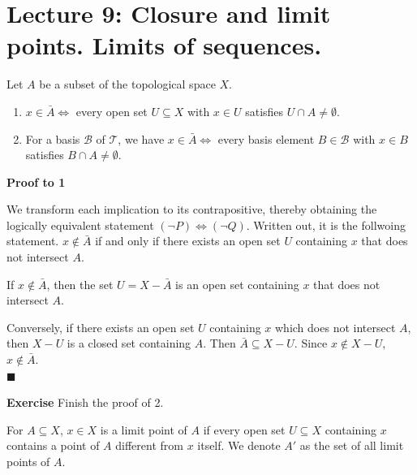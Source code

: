 \documentclass[main.tex]{subfiles}
\begin{document}
\pagestyle{plain}
\setcounter{chapter}{8}

\chapter{Lecture 9: Closure and limit points. Limits of sequences. }
\label{chap:Lecture9}

\begin{theorem}
    Let $A$ be a subset of the topological space $X$. 
    \begin{enumerate}
        \item $x\in \bar{A} \Longleftrightarrow $ every open set $U \subseteq X$ with $x \in U$ satisfies $U \cap A \neq \emptyset$.
        \item For a basis $\mathcal{B}$ of $\mathcal{T}$, we have $x \in \bar{A} \Longleftrightarrow$ every basis element $B \in \mathcal{B}$ with $x \in B$ satisfies $B \cap A \neq \emptyset$. 
    \end{enumerate}
\end{theorem}

\par \noindent \textbf{Proof to 1} 
\par We transform each implication to its contrapositive, thereby obtaining the logically equivalent statement $(\lnot P) \Longleftrightarrow (\lnot Q)$. Written out, it is the follwoing statement. $x\notin \bar{A}$ if and only if there exists an open set $U$ containing $x$ that does not intersect $A$. 
\par If $x \notin \bar{A}$, then the set $U = X - \bar{A}$ is an open set containing $x$ that does not intersect $A$.
\par Conversely, if there exists an open set $U$ containing $x$ which does not intersect $A$, then $X-U$ is a closed set containing $A$. Then $\bar{A} \subseteq X - U$. Since $x \notin X - U$, $x\notin \bar{A}$. 
\mbox{} \\ \null \hfill $\blacksquare$ 

\par \noindent \textbf{Exercise} Finish the proof of 2. 

\begin{definition}
    For $A \subseteq X$, $x\in X$ is a limit point of $A$ if every open set $U \subseteq X$ containing $x$ contains a point of $A$ different from $x$ itself. We denote $A'$ as the set of all limit points of $A$.
\end{definition}
\end{document}
